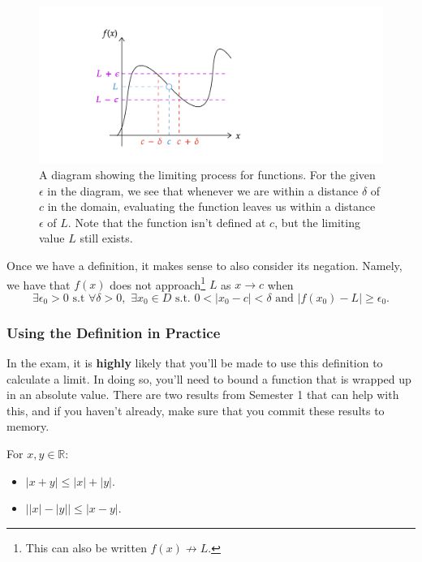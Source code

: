 \documentclass[
  17pt,
  a4paper]{extarticle}
\providecommand{\tightlist}{%
  \setlength{\itemsep}{0pt}\setlength{\parskip}{0pt}}
\theoremstyle{plain}
\theoremstyle{definition}
\theoremstyle{plain}
\theoremstyle{plain}
\theoremstyle{plain}
\theoremstyle{plain}
\theoremstyle{definition}
\theoremstyle{definition}
\theoremstyle{remark}
\theoremstyle{remark}
\let\BeginKnitrBlock\begin \let\EndKnitrBlock\end
\renewcommand{\;}{\,}
\begin{document}
\begin{figure}
\includegraphics[width=\Width,height=\Height]{Functionlimit} \caption{A diagram showing the limiting process for functions. For the given $\epsilon$ in the diagram, we see that whenever we are within a distance $\delta$ of $c$ in the domain, evaluating the function leaves us within a distance $\epsilon$ of $L$. Note that the function isn't defined at $c$, but the limiting value $L$ still exists.}\label{fig:funclim}
\end{figure}

Once we have a definition, it makes sense to also consider its negation. Namely, we have that \(f(x)\) does not approach\footnote{This can also be written \(f(x) \not\to L\).} \(L\) as \(x \to c\) when \[\exists \epsilon_0 > 0\;\;\text{s.t}\;\;\forall \delta > 0,\;\; \exists x_0 \in D \;\; \text{s.t.}\;\; 0 < \lvert x_0 - c \rvert < \delta\;\; \text{and}\;\; \lvert f(x_0) - L \rvert \geq \epsilon_0.\]

\hypertarget{using-the-definition-in-practice}{%
\subsubsection{Using the Definition in Practice}\label{using-the-definition-in-practice}}

In the exam, it is \textbf{highly} likely that you'll be made to use this definition to calculate a limit. In doing so, you'll need to bound a function that is wrapped up in an absolute value. There are two results from Semester 1 that can help with this, and if you haven't already, make sure that you commit these results to memory.
\BeginKnitrBlock{theorem}[Triangle Inequalities]
{\label{thm:thm46} }For \(x,y \in \mathbb{R}\):

\begin{itemize}
\tightlist
\item
  \(\lvert x + y \rvert \leq \lvert x \rvert + \lvert y \rvert.\)
\item
  \(\left\lvert \lvert x \rvert - \lvert y \rvert \right\rvert \leq \lvert x - y \rvert.\)
\end{itemize}
\EndKnitrBlock{theorem}
\end{document}
